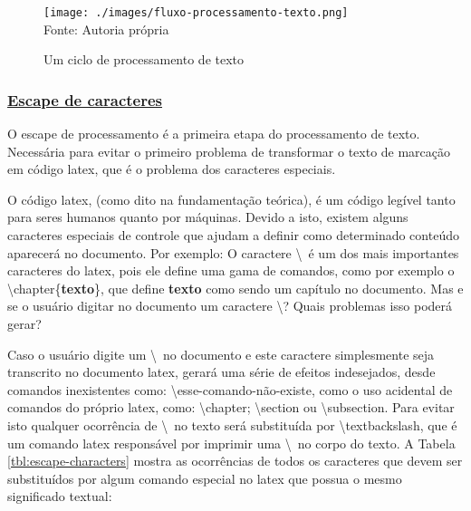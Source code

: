 \begin{figure}[H]
    \centering
    \caption{Um ciclo de processamento de texto}
    \texttt{[image: ./images/fluxo-processamento-texto.png]}
    \label{fig:fluxo-processamento-texto} \\
    \textnormal{\fontsize{10pt}{12pt}Fonte: Autoria própria}
\end{figure}



\subsubsection{\underline{Escape de caracteres}}

O escape de processamento é a primeira etapa do processamento
de texto. Necessária para evitar o primeiro problema de transformar
o texto de marcação em código
\acrshort{latex},
que é o problema dos caracteres especiais.

O código
\acrshort{latex},
(como dito na fundamentação teórica),
é um código legível tanto para seres humanos
quanto por máquinas. Devido a isto, existem alguns caracteres
especiais de controle que ajudam a definir como
determinado conteúdo aparecerá no documento. Por exemplo:
O caractere \textbackslash~é  um dos mais importantes caracteres do
\acrshort{latex},
pois ele
define uma gama de comandos, como por exemplo o \textbackslash chapter\{\textbf{texto}\},
que define
\textbf{texto}
como sendo um capítulo no documento.
Mas e se o usuário digitar no documento um caractere \textbackslash ?
Quais problemas isso poderá gerar?

Caso o usuário digite um \textbackslash~no documento e este caractere simplesmente seja
transcrito no documento
\acrshort{latex},
gerará uma série de efeitos indesejados, desde
comandos inexistentes como: \textbackslash esse-comando-não-existe,
como o uso acidental de comandos do próprio
\acrshort{latex},
como:
\textbackslash chapter; \textbackslash section ou \textbackslash subsection.
Para evitar isto qualquer ocorrência de
\textbackslash~no texto será substituída por \textbackslash textbackslash, que é um comando
\acrshort{latex}
responsável por imprimir uma \textbackslash~no corpo
do texto.
A
Tabela \ref{tbl:escape-characters}
mostra as ocorrências de todos os caracteres que devem ser substituídos
por algum comando especial no
\acrshort{latex}
que possua o mesmo significado textual:

